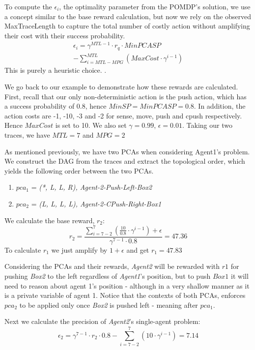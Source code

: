 {To compute the $\epsilon_i$, the optimality parameter from the
POMDP's solution, we use a concept similar to the base reward calculation, but now we rely on the observed MaxTraceLength to capture the total number of costly action without amplifying their cost with their success probability.
\begin{align*}
\label{eqn:rq}
   \epsilon_i = \gamma^{MTL-1}\cdot r_q \cdot MinPCASP \\
   -\sum_{i=MTL - MPG }^{MTL}(MaxCost \cdot \gamma^{i-1})
\end{align*}
This is purely a heuristic choice.
.

\begin{example}
We go back to our example to demonstrate how these rewards are calculated.
First, recall that our only non-deterministic action is the push action, which has a success probability of 0.8, hence $MinSP=MinPCASP=0.8$. In addition, the action costs are -1, -10, -3 and -2 for sense, move, push and cpush respectively. Hence $MaxCost$ is set to 10. We also set $\gamma=0.99$, $\epsilon=0.01$.
Taking our two traces, we have $MTL=7$ and $MPG=2$


As mentioned previously, we have two PCAs when considering Agent1's problem.
We construct the DAG from the traces and extract the topological order, which yields the following order between the two PCAs.
\begin{enumerate}
    \item $pca_1$ = \emph{(*, L, L, R), Agent-2-Push-Left-Box2}
    \item $pca_2$ = \emph{(L, L, L, L), Agent-2-CPush-Right-Box1}
\end{enumerate}


We calculate the base reward, $r_2$:
\begin{equation}
     r_2 = \frac{\sum_{i=7-2}^{7}(\frac{10}{0.8} \cdot \gamma^{i-1})+ \epsilon}{\gamma^{7-1}\cdot 0.8} = 47.36
\end{equation}
To calculate $r_1$ we just amplify by $1+\epsilon$ and get $r_1=47.83$

Considering the PCAs and their rewards, \emph{Agent2} will be rewarded with $r1$ for pushing \emph{Box2} to the left regardless of \emph{Agent1}'s position, but to push $Box1$ it will need to reason about agent 1's position - although in a very shallow manner as it is a private variable of agent 1.
Notice that the contexts of both PCAs, enforces $pca_2$ to be applied only once \emph{Box2} is pushed left - meaning after $pca_1$.


Next we calculate the precision of \emph{Agent2}'s single-agent problem: \begin{equation}
     \epsilon_2 = \gamma^{7-1}\cdot r_2 \cdot 0.8 - \sum_{i=7-2}^{7}(10 \cdot \gamma^{i-1}) = 7.14
\end{equation}
\end{example}
}